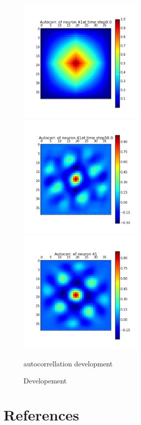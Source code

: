 \documentclass[a4paper, 12pt]{article}
\begin{document}
\begin{figure}[htbp]
\begin{minipage}[hbt]{0,49\textwidth}
        \centering
\includegraphics[width=6cm,height=6cm]{neurons/neuron_a_41_t_0.png}\\[10pt]
\includegraphics[width=6cm,height=6cm]{neurons/neuron_a_41_t_50.png}\\[10pt]
\includegraphics[width=6cm,height=6cm]{neurons/neuron_a_41.png}
        \caption{autocorrellation development}
        \label{LabelB}
\end{minipage}
\centering
\caption{Developement }
\end{figure}

\section{References}
\end{document}
